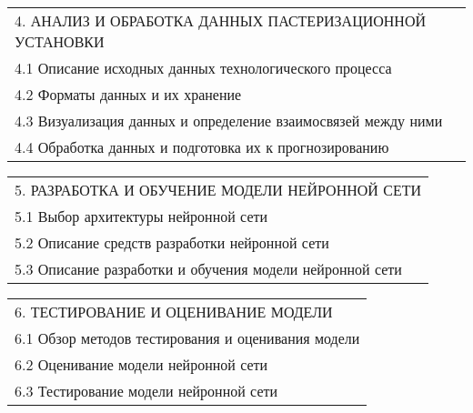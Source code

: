 \documentclass[12pt, А4, twoside]{article} %
\begin{document}
\begin{FlushLeft}
    \begin{tabular}{p{17.25cm}} 
        \textsf{4. АНАЛИЗ И ОБРАБОТКА ДАННЫХ ПАСТЕРИЗАЦИОННОЙ УСТАНОВКИ} \vspace{1pt} \hline \\
        \hspace{0.3cm}\textsf{4.1 Описание исходных данных технологического процесса} \vspace{1pt} \hline \\
        \hspace{0.3cm}\textsf{4.2 Форматы данных и их хранение} \vspace{1pt} \hline \\
        \hspace{0.3cm}\textsf{4.3 Визуализация данных и определение взаимосвязей между ними} \vspace{1pt} \hline \\
        \hspace{0.3cm}\textsf{4.4 Обработка данных и подготовка их к прогнозированию} \vspace{1pt} \hline \\
    \end{tabular}    

    \begin{tabular}{p{17.25cm}} 
        \textsf{5. РАЗРАБОТКА И ОБУЧЕНИЕ МОДЕЛИ НЕЙРОННОЙ СЕТИ} \vspace{1pt} \hline \\
        \hspace{0.3cm}\textsf{5.1 Выбор архитектуры нейронной сети} \vspace{1pt} \hline \\
        \hspace{0.3cm}\textsf{5.2 Описание средств разработки нейронной сети} \vspace{1pt} \hline \\
        \hspace{0.3cm}\textsf{5.3 Описание разработки и обучения модели нейронной сети} \vspace{1pt} \hline \\
    \end{tabular}  

    \begin{tabular}{p{17.25cm}} 
        \textsf{6. ТЕСТИРОВАНИЕ И ОЦЕНИВАНИЕ МОДЕЛИ} \vspace{1pt} \hline \\
        \hspace{0.5cm}\textsf{6.1 Обзор методов тестирования и оценивания модели} \vspace{1pt} \hline \\
        \hspace{0.5cm}\textsf{6.2 Оценивание модели нейронной сети} \vspace{1pt} \hline \\
        \hspace{0.5cm}\textsf{6.3 Тестирование модели нейронной сети} \vspace{1pt} \hline \\
    \end{tabular} 


\end{FlushLeft}
\end{document}
